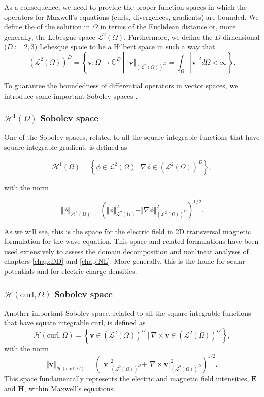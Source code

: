 As a consequence, we need to provide the proper function spaces in which the operators for Maxwell's equations (curls, divergences, gradients) are bounded. We define the  of the solution in $\Omega$ in terms of the Euclidean distance or, more generally, the Lebesgue space $\mathcal{L}^2(\Omega)$. Furthermore, we define the $D$-dimensional ($D := 2,3$) Lebesque space to be a Hilbert space in such a way that
$$\left (\mathcal{L}^2(\Omega)\right)^D = \left \lbrace \mathbf{v} : \Omega \rightarrow \mathbb{C}^D \ | \ \Vert \mathbf{v}\Vert_{(\mathcal{L}^2(\Omega))^D }  = \int_\Omega |\mathbf{v}|^2 d\Omega < \infty \right \rbrace.$$

To guarantee the boundedness of differential operators in vector spaces, we introduce some important Sobolev spaces \cite{monk2003finite}.

\subsubsection{\texorpdfstring{$\mathcal{H}^1(\Omega)$ Sobolev space}{H1 Sobolev space}}

One of the Sobolev spaces, related to all the square integrable functions that have square integrable gradient, is defined as

$$\mathcal{H}^1(\Omega) = \left \lbrace \phi \in \mathcal{L}^2(\Omega) \ | \ \nabla \phi \in (\mathcal{L}^2(\Omega))^D \right \rbrace,$$

\noindent with the norm

$$\Vert\phi\Vert_{\mathcal{H}^1(\Omega)} = \left( \Vert\phi\Vert_{\mathcal{L}^2(\Omega)}^2 + \Vert\nabla \phi\Vert_{(\mathcal{L}^2(\Omega))^D}^2 \right)^{1/2}.$$

\noindent As we will see, this is the  space for the electric field in 2D transversal magnetic formulation for the wave equation. This space and related formulations have been used extensively to assess the domain decomposition and nonlinear analyses of chapters \ref{chap:DD} and \ref{chap:NL}. More generally, this is the home for scalar potentials and for electric charge densities.

\subsubsection{\texorpdfstring{$\mathcal{H}(\mathrm{curl},\Omega)$ Sobolev space}{Hcurl Sobolev space}}

Another important Sobolev space, related to all the square integrable functions that have square integrable curl, is defined as
%
$$\mathcal{H}(\mathrm{curl},\Omega) = \left \lbrace \mathbf{v} \in (\mathcal{L}^2(\Omega))^D \ | \ \nabla  \times \mathbf{v} \in (\mathcal{L}^2(\Omega))^D \right\rbrace,$$
%
\noindent with the norm
%
$$\Vert\mathbf{v}\Vert_{\mathcal{H}(\mathrm{curl},\Omega)} = \left( \Vert \mathbf{v} \Vert_{(\mathcal{L}^2(\Omega))^D}^2 + \Vert\nabla \times \mathbf{v} \Vert_{(\mathcal{L}^2(\Omega))^D}^2 \right)^{1/2}.$$
%
\noindent This space fundamentally represents the electric and magnetic field intensities, $\mathbf{E}$ and $\mathbf{H}$, within Maxwell's equations.
%
